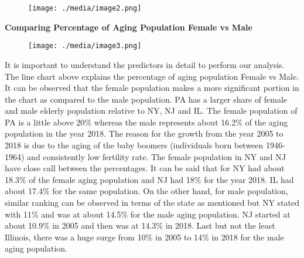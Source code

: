 \documentclass[12pt]{article}
\begin{document}

\begin{figure}[H]
\advance\leftskip 0.42in		\texttt{[image: ./media/image2.png]}
\end{figure}



\par


\vspace{\baselineskip}

\vspace{\baselineskip}
\begin{adjustwidth}{0.5in}{0.0in}
\begin{justify}
\textbf{Comparing Percentage of Aging Population Female vs Male}
\end{justify}\par

\end{adjustwidth}




\begin{figure}[H]
\advance\leftskip 0.11in		\texttt{[image: ./media/image3.png]}
\end{figure}



\par

\begin{justify}
It is important to understand the predictors in detail to perform our analysis. The line chart above explains the percentage of aging population Female vs Male. It can be observed that the female population makes a more significant portion in the chart as compared to the male population. PA has a larger share of female and male elderly population relative to NY, NJ and IL. The female population of PA is a little above 20$\%$  whereas the male represents about 16.2$\%$  of the aging population in the year 2018. The reason for the growth from the year 2005 to 2018 is due to the aging of the baby boomers (individuals born between 1946-1964) and consistently low fertility rate. The female population in NY and NJ have close call between the percentages. It can be said that for NY had about 18.3$\%$  of the female aging population and NJ had 18$\%$  for the year 2018. IL had about 17.4$\%$  for the same population. On the other hand, for male population, similar ranking can be observed in terms of the state as mentioned but NY stated with 11$\%$  and was at about 14.5$\%$  for the male aging population. NJ started at about 10.9$\%$  in 2005 and then was at 14.3$\%$  in 2018. Last but not the least Illinois, there was a huge surge from 10$\%$  in 2005 to 14$\%$  in 2018 for the male aging population.
\end{justify}\par
\end{document}
